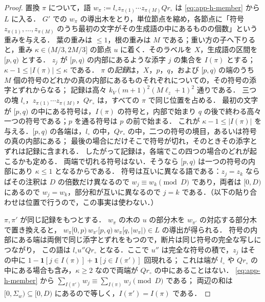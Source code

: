 \begin{proof}
置換 $\pi$ について，語 $w_\pi:=l_\circ z_{\pi(1)}\cdots z_{\pi(M)}Qr_\circ$ は \eqref{eq:app-h-member} から $L$ に入る．
$G'$ での $w_\pi$ の導出木をとり，単位節点を縮め，各節点に「符号 $z_{\pi(1)},\ldots,z_{\pi(M)}$ のうち最初の文字がその生成語の中にあるものの個数」という重みを与える．
葉の重みは $\le1$，根の重みは $M$ である；重い方の子へ下りると，重み $\kappa\in(M/3,2M/3]$ の節点 $u$ に着く．そのラベルを $X$，生成語の区間を $[p,q)$ とする．
$z_j$ が $[p,q)$ の内部にあるような添字 $j$ の集合を $I(\pi)$ とする；$\kappa-1\le|I(\pi)|\le\kappa$ である．
$\pi$ の\emph{記録}は，$X$，$p$，$q$，および $[p,q)$ の端のうち $M$ 個の符号のどれかの真の内部にあるものそれぞれについての，その符号の添字とずれからなる；
記録は高々 $k_V(m+1)^2(M\ell_z+1)^2$ 通りである．
三つの塊 $l_\circ$，$z_{\pi(1)}\cdots z_{\pi(M)}$，$Qr_\circ$ は，すべての $\pi$ で同じ位置を占める．
最初の文字が $[p,q)$ の中にある符号は，$I(\pi)$ の符号と，内部で始まり $q$ の後で終わる高々一つの符号である；$p$ を通る符号は $p$ の前で始まる．
これが $\kappa-1\le|I(\pi)|$ を与える．$[p,q)$ の各端は，$l_\circ$ の中，$Qr_\circ$ の中，二つの符号の境目，あるいは符号の真の内部にある；
最後の場合にだけそこで符号が切れ，そのときその添字とずれは記録に含まれる．
したがって記録は，各端でこの四つの場合のどれが起こるかも定める．
両端で切れる符号はない．そうなら $[p,q)$ は一つの符号の内部にあり $\kappa\le1$ となるからである．
符号は互いに異なる語である：$z_j=z_k$ ならばその注釈は $D$ の倍数だけ異なるので $w_j\equiv w_k\pmod D$ であり，両者は $[0,D)$ にあるので $w_j=w_k$，部分和が互いに異なるので $j=k$ である．（以下の貼り合わせは位置で行うので，この事実は使わない．）

$\pi,\pi'$ が同じ記録をもつとする．
$w_\pi$ の木の $u$ の部分木を $w_{\pi'}$ の対応する部分木で置き換えると，
$w_\pi[0,p)\,w_{\pi'}[p,q)\,w_\pi[q,|w_\pi|)\in L$ の導出が得られる．
符号の内部にある端は両側で同じ添字とずれをもつので，断片は同じ符号の完全な写しにつながり，
この語は $l_\circ u''Qr_\circ$ となる．ここで $u''$ は完全な符号の積で，$z_j$ はその中に
$1-\mathbf 1[j\in I(\pi)]+\mathbf 1[j\in I(\pi')]$ 回現れる；
これは端が $l_\circ$ や $Qr_\circ$ の中にある場合も含み，$\kappa\ge2$ なので両端が $Qr_\circ$ の中にあることはない．
\eqref{eq:app-h-member} から $\sum_{I(\pi')}w_j\equiv\sum_{I(\pi)}w_j\pmod D$ である；
両辺の和は $[0,\Sigma_w)\subseteq[0,D)$ にあるので等しく，$I(\pi')=I(\pi)$ である．


\end{proof}
